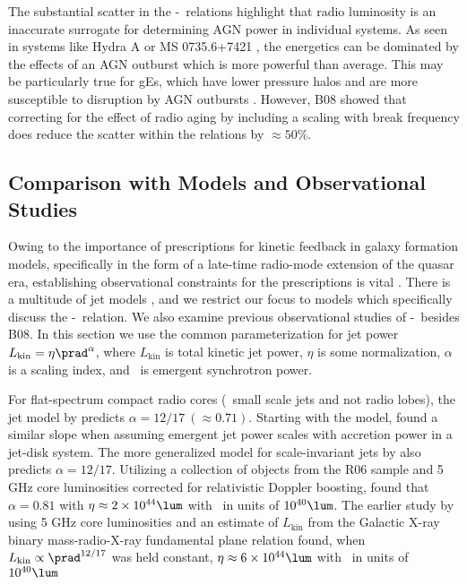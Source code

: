 \documentclass{emulateapj}
\begin{document}
The substantial scatter in the \pjet-\prad\ relations highlight that
radio luminosity is an inaccurate surrogate for determining AGN power
in individual systems. As seen in systems like Hydra A \citep{hydraa}
or MS 0735.6+7421 \citep{ms0735}, the energetics can be dominated by
the effects of an AGN outburst which is more powerful than
average. This may be particularly true for gEs, which have lower
pressure halos and are more susceptible to disruption by AGN outbursts
\citep{2006MNRAS.372.1161W, 2008ApJ...687L..53P}. However, B08 showed
that correcting for the effect of radio aging by including a scaling
with break frequency does reduce the scatter within the relations by
$\approx 50\%$.

\subsection{Comparison with Models and Observational Studies}
\label{sec:models}

Owing to the importance of prescriptions for kinetic feedback in
galaxy formation models, specifically in the form of a late-time
radio-mode extension of the quasar era, establishing observational
constraints for the prescriptions is vital
\citep[\eg][]{2007ApJ...658L...9H}. There is a multitude of jet models
\citep[\ie][]{1973MNRAS.164..243L, 1974MNRAS.166..513S,
  1974MNRAS.169..395B, 1989ApJ...345L..21B, 2002ApJS..141..337C,
  2002ApJS..141..371C}, and we restrict our focus to models which
specifically discuss the \pjet-\prad\ relation. We also examine
previous observational studies of \pjet-\prad\ besides B08. In this
section we use the common parameterization for jet power
$L_{\mathrm{kin}} = \eta \prad^{\alpha}$, where $L_{\mathrm{kin}}$ is
total kinetic jet power, $\eta$ is some normalization, $\alpha$ is a
scaling index, and \prad\ is emergent synchrotron power.

For flat-spectrum compact radio cores (\eg\ small scale jets and not
radio lobes), the jet model by \citet{1979ApJ...232...34B} predicts
$\alpha = 12/17~(\approx 0.71)$. Starting with the
\citet{1979ApJ...232...34B} model, \citet{1995A&A...293..665F} found a
similar slope when assuming emergent jet power scales with accretion
power in a jet-disk system. The more generalized model for
scale-invariant jets by \citet{2003MNRAS.343L..59H} also predicts
$\alpha = 12/17$. Utilizing a collection of objects from the R06
sample and 5 GHz core luminosities corrected for relativistic Doppler
boosting, \citet{2007MNRAS.381..589M} found that $\alpha = 0.81$ with
$\eta \approx 2\times10^{44} \lum$ with \prad\ in units of $10^{40}
\lum$. The earlier study by \citet{2005ApJ...633..384H} using 5 GHz
core luminosities and an estimate of $L_{\mathrm{kin}}$ from the
Galactic X-ray binary mass-radio-X-ray fundamental plane relation
\citep{2003MNRAS.344...60G, 2003MNRAS.345.1057M} found, when
$L_{\mathrm{kin}} \propto \prad^{12/17}$ was held constant, $\eta
\approx 6\times10^{44} \lum$ with \prad\ in units of $10^{40} \lum$
\end{document}

